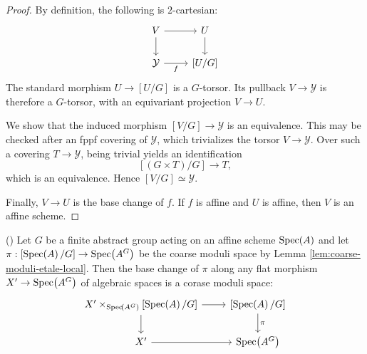 \begin{proof}
	By definition, the following is $2$-cartesian:
	\[\begin{tikzcd}
		V & U \\
		{\mathcal{Y}} & {[U/G]}
		\arrow[from=1-1, to=1-2]
		\arrow[from=1-1, to=2-1]
		\arrow[from=1-2, to=2-2]
		\arrow["f"', from=2-1, to=2-2]
	\end{tikzcd}\]
	The standard morphism $U\to[U/G]$ is a $G$-torsor.
	Its pullback $V\to\mathcal{Y}$ is therefore a $G$-torsor,
	with an equivariant projection $V\to U$.
	
	We show that the induced morphism
	$[V/G]\to\mathcal{Y}$ is an equivalence.
	This may be checked after an fppf covering of
	$\mathcal{Y}$, which trivializes the torsor $V\to\mathcal{Y}$.
	Over such a covering $T\to\mathcal{Y}$, being trivial yields an identification
	\[
	[(G\times T)/G]\longrightarrow T,
	\]
	which is an equivalence. Hence $[V/G]\simeq\mathcal{Y}$.
	
	Finally, $V\to U$ is the base change of $f$. If $f$ is affine and $U$ is affine,
	then $V$ is an affine scheme.
\end{proof}









\begin{lemma}\label{lem:coarse-moduli-flat-base-change}
	(\cite[Theorem 4.3.6. (1)]{alper2023stacks})
	Let $G$ be a finite abstract group acting on an affine scheme $\operatorname{Spec}\!\left(A\right)$ and let $\pi: [\operatorname{Spec}\!\left(A\right) / G] \to \operatorname{Spec}\!\left(A^G\right)$ be the coarse moduli space by Lemma \ref{lem:coarse-moduli-etale-local}. 
	Then the base change of $\pi$ along any flat morphism $X' \to \operatorname{Spec}\!\left(A^G\right)$ of algebraic spaces is a corase moduli space:
	\[\begin{tikzcd}
		{X'\times_{\Specof{A^G}}[\Specof{A} /G]} & {[\Specof{A} /G]} \\
		{X'} & {\Specof{A^G}}
		\arrow[from=1-1, to=1-2]
		\arrow[from=1-1, to=2-1]
		\arrow["\pi", from=1-2, to=2-2]
		\arrow[from=2-1, to=2-2]
	\end{tikzcd}\]
\end{lemma}

